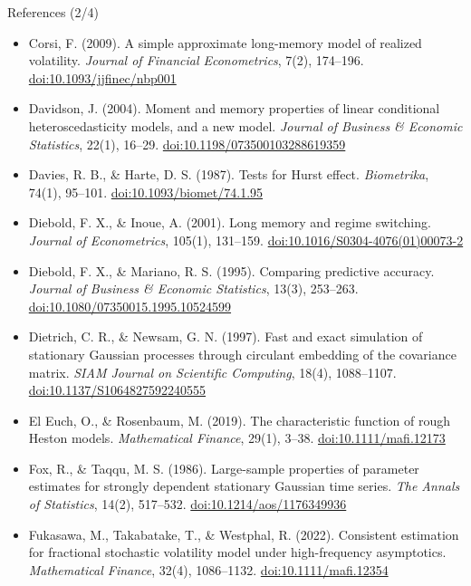 \begin{frame}{References (2/4)}
\itemsize{\tiny}
\begin{itemize}
    \item Corsi, F. (2009). A simple approximate long-memory model of realized volatility. \textit{Journal of Financial Econometrics}, 7(2), 174--196. \href{https://doi.org/10.1093/jjfinec/nbp001}{doi:10.1093/jjfinec/nbp001}
    \item Davidson, J. (2004). Moment and memory properties of linear conditional heteroscedasticity models, and a new model. \textit{Journal of Business \& Economic Statistics}, 22(1), 16--29. \href{https://doi.org/10.1198/073500103288619359}{doi:10.1198/073500103288619359}
    \item Davies, R. B., \& Harte, D. S. (1987). Tests for Hurst effect. \textit{Biometrika}, 74(1), 95--101. \href{https://doi.org/10.1093/biomet/74.1.95}{doi:10.1093/biomet/74.1.95}
    \item Diebold, F. X., \& Inoue, A. (2001). Long memory and regime switching. \textit{Journal of Econometrics}, 105(1), 131--159. \href{https://doi.org/10.1016/S0304-4076(01)00073-2}{doi:10.1016/S0304-4076(01)00073-2}
    \item Diebold, F. X., \& Mariano, R. S. (1995). Comparing predictive accuracy. \textit{Journal of Business \& Economic Statistics}, 13(3), 253--263. \href{https://doi.org/10.1080/07350015.1995.10524599}{doi:10.1080/07350015.1995.10524599}
    \item Dietrich, C. R., \& Newsam, G. N. (1997). Fast and exact simulation of stationary Gaussian processes through circulant embedding of the covariance matrix. \textit{SIAM Journal on Scientific Computing}, 18(4), 1088--1107. \href{https://doi.org/10.1137/S1064827592240555}{doi:10.1137/S1064827592240555}
    \item El Euch, O., \& Rosenbaum, M. (2019). The characteristic function of rough Heston models. \textit{Mathematical Finance}, 29(1), 3--38. \href{https://doi.org/10.1111/mafi.12173}{doi:10.1111/mafi.12173}
    \item Fox, R., \& Taqqu, M. S. (1986). Large-sample properties of parameter estimates for strongly dependent stationary Gaussian time series. \textit{The Annals of Statistics}, 14(2), 517--532. \href{https://doi.org/10.1214/aos/1176349936}{doi:10.1214/aos/1176349936}
    \item Fukasawa, M., Takabatake, T., \& Westphal, R. (2022). Consistent estimation for fractional stochastic volatility model under high-frequency asymptotics. \textit{Mathematical Finance}, 32(4), 1086--1132. \href{https://doi.org/10.1111/mafi.12354}{doi:10.1111/mafi.12354}

\end{itemize}
\end{frame}
